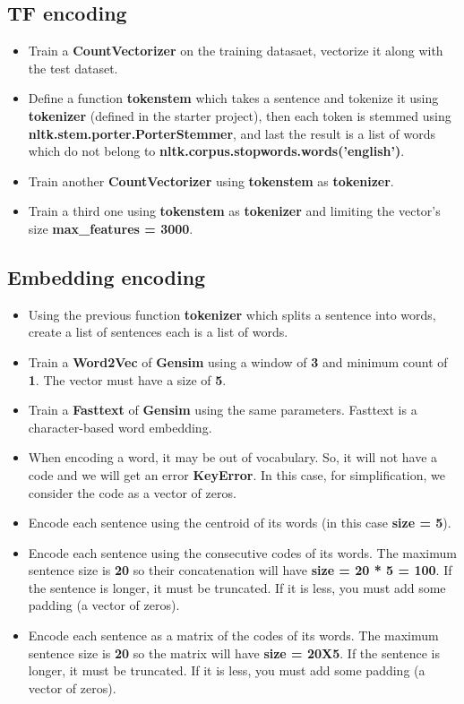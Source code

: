 \documentclass[11pt, a4paper]{article}
\begin{document}
\subsection{TF encoding}

\begin{itemize}
	\item Train a \textbf{CountVectorizer} on the training datasaet, vectorize it along with the test dataset. 
	\item Define a function \textbf{tokenstem} which takes a sentence and tokenize it using \textbf{tokenizer} (defined in the starter project), then each token is stemmed using \textbf{nltk.stem.porter.PorterStemmer}, and last the result is a list of words which do not belong to \textbf{nltk.corpus.stopwords.words('english')}.
	\item Train another \textbf{CountVectorizer} using  \textbf{tokenstem} as \textbf{tokenizer}. 
	\item Train a third one using  \textbf{tokenstem} as \textbf{tokenizer} and limiting the vector's size \textbf{max\_features = 3000}.
\end{itemize}

\subsection{Embedding encoding}

\begin{itemize}
	\item Using the previous function \textbf{tokenizer} which splits a sentence into words, create a list of sentences each is a list of words.	
	\item Train a \textbf{Word2Vec} of \textbf{Gensim} using a window of \textbf{3} and minimum count of \textbf{1}.
	The vector must have a size of \textbf{5}.
	\item Train a \textbf{Fasttext} of \textbf{Gensim} using the same parameters. Fasttext is a character-based word embedding.
	\item When encoding a word, it may be out of vocabulary. So, it will not have a code and we will get an error \textbf{KeyError}.
	In this case, for simplification, we consider the code as a vector of zeros.
	\item Encode each sentence using the centroid of its words (in this case \textbf{size = 5}).
	\item Encode each sentence using the consecutive codes of its words. 
	The maximum sentence size is \textbf{20} so their concatenation will have \textbf{size = 20 * 5 = 100}. 
	If the sentence is longer, it must be truncated.
	If it is less, you must add some padding (a vector of zeros).
	\item Encode each sentence as a matrix of the codes of its words.
	The maximum sentence size is \textbf{20} so the matrix will have \textbf{size = 20X5}.
	If the sentence is longer, it must be truncated.
	If it is less, you must add some padding (a vector of zeros).
\end{itemize}
\end{document}
